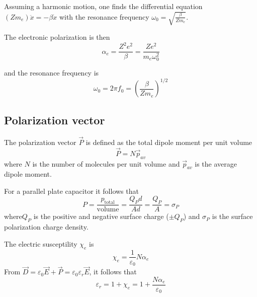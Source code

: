 Assuming a harmonic motion, one finds the differential equation $(Z m_e) \ddot{x} = -\beta\dot{x}$ with the resonance frequency $\omega_0 = \sqrt{\frac{\beta}{Z m_e}}$.

The electronic polarization is then
\begin{equation}
	\alpha_e = \frac{Z^2 e^2}{\beta} = \frac{Z e^2 }{m_e \omega_0^2}
\end{equation}

and the resonance frequency is
\begin{equation}
	\omega_0 = 2 \pi f_0 = \left( \frac{\beta}{Zm_e} \right)^{1/2}
\end{equation}

\subsection{Polarization vector}
The polarization vector $\vec{P}$ is defined as the total dipole moment per unit volume
\begin{equation}
	\vec{P} = N \vec{p}_{av}
\end{equation}
where $N$ is the number of molecules per unit volume and $\vec{p}_{av}$ is the average dipole moment.

For a parallel plate capacitor it follows that
\begin{equation}
	P = \frac{p_{\text{total}}}{\text{volume}} = \frac{Q_P d}{A d} = \frac{Q_P}{A} = \sigma_P
\end{equation}
where$Q_P$ is the positive and negative surface charge ($\pm Q_P$) and $\sigma_P$ is the surface polarization charge density.

The electric susceptility $\chi_e$ is
\begin{equation}
	\chi _e = \frac{1}{\varepsilon_0} N \alpha_e
\end{equation}
From $\vec{D}=\varepsilon_0 \vec{E} + \vec{P} = \varepsilon_0\varepsilon_r \vec{E}$, it follows that
\begin{equation}
	\varepsilon_r  = 1 + \chi_e = 1 + \frac{N \alpha_e}{\varepsilon_0}
\end{equation}
